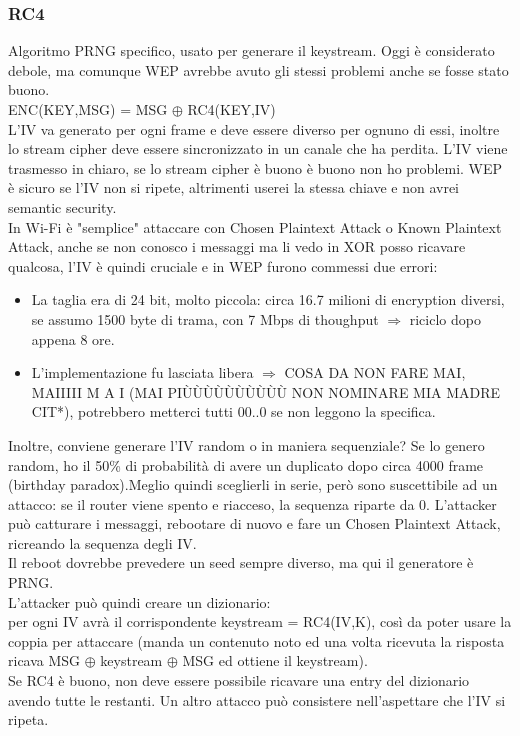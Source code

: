 \documentclass[16px]{article}
\begin{document}
\subsubsection{RC4}
Algoritmo PRNG specifico, usato per generare il keystream. Oggi è considerato debole, ma comunque WEP avrebbe avuto gli stessi problemi anche se fosse stato buono.\\ ENC(KEY,MSG) = MSG $\oplus$ RC4(KEY,IV)\\ L'IV va generato per ogni frame e deve essere diverso per ognuno di essi, inoltre lo stream cipher deve essere sincronizzato in un canale che ha perdita. L'IV viene trasmesso in chiaro, se lo stream cipher è buono è buono non ho problemi. WEP è sicuro se l'IV non si ripete, altrimenti userei la stessa chiave e non avrei semantic security.\\ In Wi-Fi è "semplice" attaccare con Chosen Plaintext Attack o Known Plaintext Attack, anche se non conosco i messaggi ma li vedo in XOR posso ricavare qualcosa, l'IV è quindi cruciale e in WEP furono commessi due errori:
\begin{itemize}
\item La taglia era di 24 bit, molto piccola: circa 16.7 milioni di encryption diversi, se assumo 1500 byte di trama, con 7 Mbps di thoughput $\Rightarrow$ riciclo dopo appena 8 ore.
\item L'implementazione fu lasciata libera $\Rightarrow$ COSA DA NON FARE MAI, MAIIIII M A I (MAI PIÙÙÙÙÙÙÙÙÙÙ NON NOMINARE MIA MADRE CIT*), potrebbero metterci tutti 00..0 se non leggono la specifica.
\end{itemize}
Inoltre, conviene generare l'IV random o in maniera sequenziale? Se lo genero random, ho il 50\% di probabilità di avere un duplicato dopo circa 4000 frame (birthday paradox).Meglio quindi sceglierli in serie, però sono suscettibile ad un attacco: se il router viene spento e riacceso, la sequenza riparte da 0. L'attacker può catturare i messaggi, rebootare di nuovo e fare un Chosen Plaintext Attack, ricreando la sequenza degli IV.\\ Il reboot dovrebbe prevedere un seed sempre diverso, ma qui il generatore è PRNG.\\ L'attacker può quindi creare un dizionario:\\ per ogni IV avrà il corrispondente keystream = RC4(IV,K), così da poter usare la coppia per attaccare (manda un contenuto noto ed una volta ricevuta la risposta ricava MSG $\oplus$ keystream $\oplus$ MSG ed ottiene il keystream).\\ Se RC4 è buono, non deve essere possibile ricavare una entry del dizionario avendo tutte le restanti. Un altro attacco può consistere nell'aspettare che l'IV si ripeta.
\end{document}

